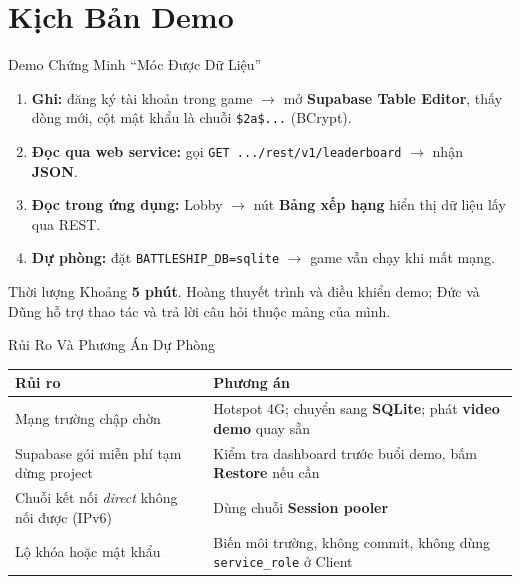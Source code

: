 \section{Kịch Bản Demo}

\begin{frame}{Demo Chứng Minh \textquotedblleft Móc Được Dữ Liệu\textquotedblright}
  \begin{enumerate}
    \item \textbf{Ghi:} đăng ký tài khoản trong game $\rightarrow$ mở \textbf{Supabase Table Editor}, thấy dòng mới, cột mật khẩu là chuỗi \texttt{\$2a\$...} (BCrypt).
    \item \textbf{Đọc qua web service:} gọi \texttt{GET .../rest/v1/leaderboard} $\rightarrow$ nhận \textbf{JSON}.
    \item \textbf{Đọc trong ứng dụng:} Lobby $\rightarrow$ nút \textbf{Bảng xếp hạng} hiển thị dữ liệu lấy qua REST.
    \item \textbf{Dự phòng:} đặt \texttt{BATTLESHIP\_DB=sqlite} $\rightarrow$ game vẫn chạy khi mất mạng.
  \end{enumerate}
  \vspace{0.2cm}
  \begin{exampleblock}{Thời lượng}
    Khoảng \textbf{5 phút}. Hoàng thuyết trình và điều khiển demo; Đức và Dũng hỗ trợ thao tác và trả lời câu hỏi thuộc mảng của mình.
  \end{exampleblock}
\end{frame}

\begin{frame}{Rủi Ro Và Phương Án Dự Phòng}
  \small
  \renewcommand{\arraystretch}{1.25}
  \begin{tabularx}{\textwidth}{@{}Y Y@{}}
    \toprule
    \textbf{Rủi ro} & \textbf{Phương án} \\
    \midrule
    Mạng trường chập chờn & Hotspot 4G; chuyển sang \textbf{SQLite}; phát \textbf{video demo} quay sẵn \\
    Supabase gói miễn phí tạm dừng project & Kiểm tra dashboard trước buổi demo, bấm \textbf{Restore} nếu cần \\
    Chuỗi kết nối \textit{direct} không nối được (IPv6) & Dùng chuỗi \textbf{Session pooler} \\
    Lộ khóa hoặc mật khẩu & Biến môi trường, không commit, không dùng \texttt{service\_role} ở Client \\
    \bottomrule
  \end{tabularx}
\end{frame}
